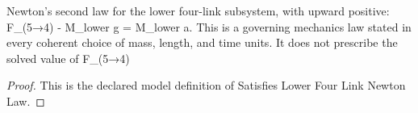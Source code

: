 \begin{definition}
  \label{def:physics:phyx-mini-0761:phyxminiproblems-problemphyxmini0761-satisfieslowerfourlinknewtonlaw}
  Newton's second law for the lower four-link subsystem, with upward positive: F\_(5→4) - M\_lower g = M\_lower a. This is a governing mechanics law stated in every coherent choice of mass, length, and time units. It does not prescribe the solved value of F\_(5→4)
\end{definition}
\begin{proof}
  This is the declared model definition of Satisfies Lower Four Link Newton Law.
\end{proof}
